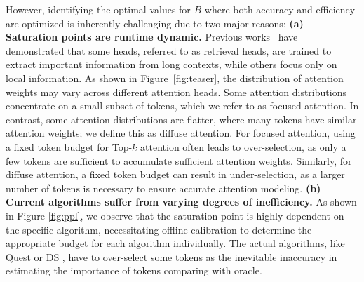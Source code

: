 However, identifying the optimal values for $B$ where both accuracy and efficiency are optimized is inherently challenging due to two major reasons:
\textbf{(a) Saturation points are runtime dynamic.} 
Previous works~\cite{wu2024retrievalheadmechanisticallyexplains, xiao2024duo} have demonstrated that some heads, referred to as retrieval heads, are trained to extract important information from long contexts, while others focus only on local information. 
As shown in Figure~\ref{fig:teaser}, the distribution of attention weights may vary across different attention heads. 
Some attention distributions concentrate on a small subset of tokens, which we refer to as focused attention. 
In contrast, some attention distributions are flatter, where many tokens have similar attention weights; we define this as diffuse attention.
For focused attention, using a fixed token budget for Top-$k$ attention often leads to over-selection, as only a few tokens are sufficient to accumulate sufficient attention weights. 
Similarly, for diffuse attention, a fixed token budget can result in under-selection, as a larger number of tokens is necessary to ensure accurate attention modeling.
\textbf{(b) Current algorithms suffer from varying degrees of inefficiency.} As shown in Figure \ref{fig:ppl}, we observe that the saturation point is highly dependent on the specific algorithm, necessitating offline calibration to determine the appropriate budget for each algorithm individually. The actual algorithms, like Quest \cite{tang2024quest} or DS \cite{yang2024post}, have to over-select some tokens as the inevitable inaccuracy in estimating the importance of tokens comparing with oracle.


